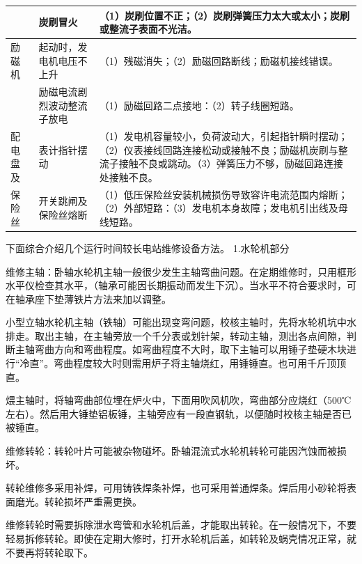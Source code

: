 \documentclass{ctexbook}
\begin{document}
\begin{table}[htbp]
\begin{tabular}{l|l|p{80em}}
		&炭刷冒火&（1）炭刷位置不正；\newline{}（2）炭刷弹簧压力太大或太小；炭刷或整流子表面不光洁。\\ \hline
		励磁机&起动时，发电机电压不上升&（1）残磁消失；\newline{}（2）励磁回路断线；励磁机接线错误。\\ \hline
		&励磁电流剧烈波动整流子放电&（1）励磁回路二点接地：\newline{}（2）转子线圈短路。\\ \hline
		配电盘及&表计指针摆动&（1）发电机容量较小，负荷波动大，引起指针瞬时摆动；\newline{}（2）仪表接线回路连接松动或接触不良；励磁机炭刷与整流子接触不良或跳动。\newline{}（3）弹簧压力不够，励磁回路连接处接触不良。\\ \hline
		保险丝&开关跳闸及保险丝熔断&（1）低压保险丝安装机械损伤导致容许电流范围内熔断；\newline{}（2）外部短路：\newline{}（3）发电机本身故障；发电机引出线及母线短路。\\
		\hline
	\end{tabular}%
	\label{tab:shigu}%
\end{table}%

下面综合介绍几个运行时间较长电站维修设备方法。
1.水轮机部分

维修主轴：卧轴水轮机主轴一般很少发生主轴弯曲问题。在定期维修时，只用框形水平仪检查其水平，（轴承可能因长期振动而发生下沉）。当水平不符合要求时，可在轴承座下垫薄铁片方法来加以调整。

小型立轴水轮机主轴（铁轴）可能出现变弯问题，校核主轴时，先将水轮机坑中水排走。取出主轴，在主轴旁放一个千分表或划针架，转动主轴，测出各点间隙，判断主轴弯曲方向和弯曲程度。如弯曲程度不大时，取下主轴可以用锤子垫硬木块进行“冷直”。弯曲程度较大时则需用炉子将主轴烧红，用锤锤直。也可用千斤顶顶直。

煨主轴时，将轴弯曲部位埋在炉火中，下面用吹风机吹，弯曲部分应烧红（500℃左右）。然后用大锤垫铝板锤，主轴旁应有一段直钢轨，以便随时校核主轴是否已被锤直。

维修转轮：转轮叶片可能被杂物碰坏。卧轴混流式水轮机转轮可能因汽蚀而被损坏。

转轮维修多采用补焊，可用铸铁焊条补焊，也可采用普通焊条。焊后用小砂轮将表面磨光。转轮损坏严重需更换。

维修转轮时需要拆除泄水弯管和水轮机后盖，才能取出转轮。在一般情况下，不要轻易拆修转轮。即使在定期大修时，打开水轮机后盖，如转轮及蜗壳情况正常，就不要再将转轮取下。
\end{document}
